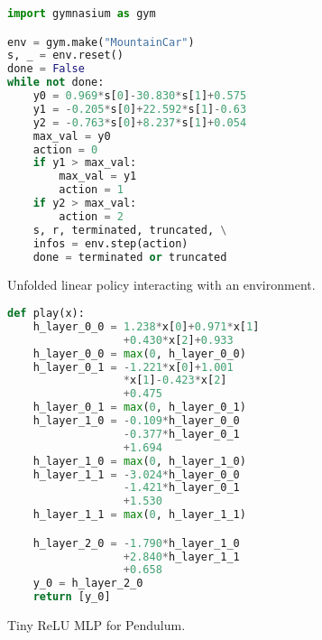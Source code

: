 \begin{figure}
\centering
\begin{minipage}{0.487\textwidth}
\begin{tcolorbox}
\begin{lstlisting}[language=Python]
import gymnasium as gym

env = gym.make("MountainCar")
s, _ = env.reset()
done = False
while not done:
    y0 = 0.969*s[0]-30.830*s[1]+0.575
    y1 = -0.205*s[0]+22.592*s[1]-0.63
    y2 = -0.763*s[0]+8.237*s[1]+0.054
    max_val = y0
    action = 0
    if y1 > max_val:
        max_val = y1
        action = 1
    if y2 > max_val:
        action = 2
    s, r, terminated, truncated, \
    infos = env.step(action)
    done = terminated or truncated
\end{lstlisting}
\end{tcolorbox}
\caption{Unfolded linear policy interacting with an environment.}\label{lst:unfolded-linear}
\end{minipage}
\hfill
\begin{minipage}{0.505\textwidth}
\begin{tcolorbox}
\begin{lstlisting}[language=Python]
def play(x):
    h_layer_0_0 = 1.238*x[0]+0.971*x[1]
                  +0.430*x[2]+0.933
    h_layer_0_0 = max(0, h_layer_0_0)
    h_layer_0_1 = -1.221*x[0]+1.001
                  *x[1]-0.423*x[2]
                  +0.475
    h_layer_0_1 = max(0, h_layer_0_1)
    h_layer_1_0 = -0.109*h_layer_0_0
                  -0.377*h_layer_0_1
                  +1.694
    h_layer_1_0 = max(0, h_layer_1_0)
    h_layer_1_1 = -3.024*h_layer_0_0
                  -1.421*h_layer_0_1
                  +1.530
    h_layer_1_1 = max(0, h_layer_1_1)

    h_layer_2_0 = -1.790*h_layer_1_0
                  +2.840*h_layer_1_1
                  +0.658
    y_0 = h_layer_2_0
    return [y_0]
\end{lstlisting}
\end{tcolorbox}
\caption{Tiny ReLU MLP for Pendulum.}\label{lst:generic-linear}
\end{minipage}
\end{figure}